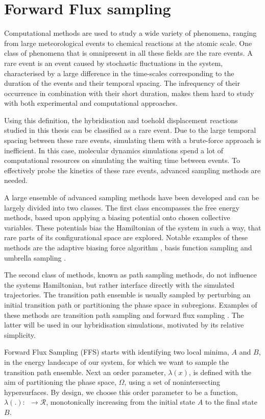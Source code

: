 \section{Forward Flux sampling}

Computational methods are used to study a wide variety of phenomena, ranging from
large meteorological events to chemical reactions at the atomic scale. One class of
phenomena that is omnipresent in all these fields are the rare events. A rare event is an
event caused by stochastic fluctuations in the system, characterised by a large
difference in the time-scales corresponding to the duration of the events and their
temporal spacing. The infrequency of their occurrence in combination with their short
duration, makes them hard to study with both experimental and computational approaches.

Using this definition, the hybridisation and toehold displacement reactions studied in
this thesis can be classified as a rare event. Due to
the large temporal spacing between these rare events, simulating them with a brute-force
approach is inefficient. In this case, molecular dynamics simulations spend a lot of
computational resources on simulating the waiting time between events. To
effectively probe the kinetics of these rare events, advanced sampling methods are
needed.

A large ensemble of advanced sampling methods have been developed and can be largely
divided into two classes. The first class encompasses the free energy methods, based upon
applying a biasing potential onto chosen collective variables. These potentials bias the
Hamiltonian of the system in such a way, that rare parts of its configurational space are
explored. Notable examples of these methods are the adaptive biasing force algorithm
\cite{Comer2015}, basis function sampling\cite{Whitmer2014} and umbrella sampling
\cite{Kästner2011}.

The second class of methods, known as path sampling methods, do not influence the
systems Hamiltonian, but rather interface directly with the simulated trajectories. The
transition path ensemble is usually sampled by perturbing an initial transition path or
partitioning the phase space in subregions. Examples of these methods are transition
path sampling \cite{Dellago2002} and forward flux sampling \cite{Allen2006}
\cite{Allen2009}.  The latter will be used in our hybridisation simulations, motivated by
its relative simplicity.

Forward Flux Sampling (FFS) starts with identifying two local minima, $A$ and $B$, in the
energy landscape of our system, for which we want to sample the transition path ensemble.
Next an order parameter, $\lambda(x)$, is defined with the aim of partitioning the
phase space, $\Omega$, using a set of nonintersecting hypersurfaces. By design, we
choose this order parameter to be a function, $\lambda(.):\ $\Omega$\ \rightarrow
\mathcal{R}$, monotonically increasing from the initial state $A$ to the final state $B$.

